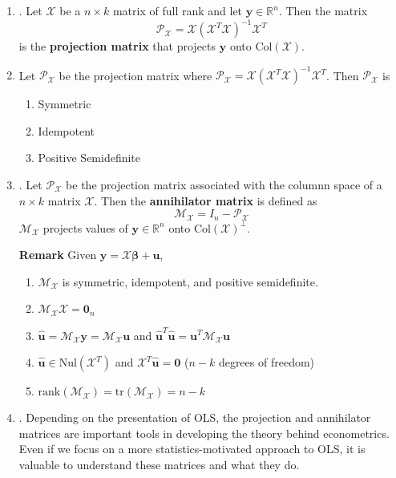 \documentclass[12pt]{article}
\begin{document}
\begin{enumerate}
\begin{enumerate}
	
	\item\underline{}.
		Let $\mathcal{X}$ be a $n\times k$ matrix of full rank and let $\mathbf{y}\in\mathbb{R}^n$. Then the matrix
			\[\mathcal{P}_{\mathcal{X}} = \mathcal{X}(\mathcal{X}^T\mathcal{X})^{-1}\mathcal{X}^T\]
		is the \textbf{projection matrix} that projects $\mathbf{y}$ onto $\text{Col}(\mathcal{X})$.

	\item\underline{} Let $\mathcal{P}_{\mathcal{X}}$ be the projection matrix where $\mathcal{P}_{\mathcal{X}}=\mathcal{X}(\mathcal{X}^T\mathcal{X})^{-1}\mathcal{X}^T$. Then $\mathcal{P}_{\mathcal{X}}$ is
		\begin{enumerate}
		\item Symmetric
		\item Idempotent
		\item Positive Semidefinite
		\end{enumerate}

	\item\underline{}.
		Let $\mathcal{P}_{\mathcal{X}}$ be the projection matrix associated with the columnn space of a $n\times k$ matrix $\mathcal{X}$. Then
		the \textbf{annihilator matrix} is defined as 
			\[\mathcal{M}_{\mathcal{X}} = I_n - \mathcal{P}_{\mathcal{X}}\]
		$\mathcal{M}_{\mathcal{X}}$ projects values of $\mathbf{y}\in\mathbb{R}^n$ onto Col$(\mathcal{X})^{\perp}$.  
		
		\textbf{Remark} Given $\mathbf{y} = \mathcal{X} \boldsymbol{\beta} + \mathbf{u}$, 
		\begin{enumerate}
			\item $\mathcal{M}_{\mathcal{X}}$ is symmetric, idempotent, and positive semidefinite. 
			\item $\mathcal{M}_{\mathcal{X}} \mathcal{X}=\mathbf{0}_n$
			\item $\hat{\mathbf{u}}=\mathcal{M}_{\mathcal{X}} \mathbf{y} = \mathcal{M}_{\mathcal{X}} \mathbf{u}$ and $\hat{\mathbf{u}}^T \hat{\mathbf{u}} = \mathbf{u}^T \mathcal{M}_{\mathcal{X}} \mathbf{u}$
			\item $\hat{\mathbf{u}} \in \text{Nul}(\mathcal{X}^T)$ and $\mathcal{X}^T \hat{\mathbf{u}} = \mathbf{0}$ \hfill ($n-k$ degrees of freedom) 
			\item $\text{rank}(\mathcal{M}_{\mathcal{X}}) = \text{tr}(\mathcal{M}_{\mathcal{X}}) = n-k$
		\end{enumerate}

	\item\underline{}.
		Depending on the presentation of OLS, the projection and annihilator matrices are important tools
		in developing the theory behind econometrics. Even if we focus on a more statistics-motivated
		approach to OLS, it is valuable to understand these matrices and what they do.
	\end{enumerate}


\end{enumerate}
\end{document}
